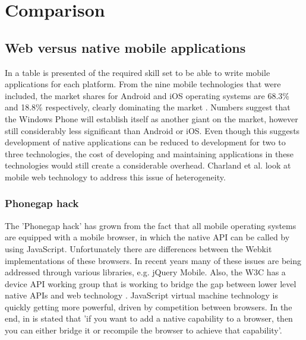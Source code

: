 \chapter{Comparison}\label{chapter:comparison}


\section{Web versus native mobile applications}

In \cite{Charland:2011:MAD:1941487.1941504} a table is presented of the required skill set to be able to write mobile applications for each platform. From the nine mobile technologies that were included, the market shares for Android and iOS operating systems are 68.3\% and 18.8\% respectively, clearly dominating the market \cite{Graziano:2012}. Numbers suggest that the Windows Phone will establish itself as another giant on the market, however still considerably less significant than Android or iOS. Even though this suggests development of native applications can be reduced to development for two to three technologies, the cost of developing and maintaining applications in these technologies would still create a considerable overhead. Charland et al. \cite{Charland:2011:MAD:1941487.1941504} look at mobile web technology to address this issue of heterogeneity.


\subsection{Phonegap hack}

The 'Phonegap hack' has grown from the fact that all mobile operating systems are equipped with a mobile browser, in which the native API can be called by using JavaScript. Unfortunately there are differences between the Webkit implementations of these browsers. In recent years many of these issues are being addressed through various libraries, e.g. jQuery Mobile. Also, the W3C has a device API working group that is working to bridge the gap between lower level native APIs and web technology \cite{Charland:2011:MAD:1941487.1941504}. JavaScript virtual machine technology is quickly getting more powerful, driven by competition between browsers. In the end, in \cite{Charland:2011:MAD:1941487.1941504} is stated that 'if you want to add a native capability to a browser, then you can either bridge it or recompile the browser to achieve that capability'.


